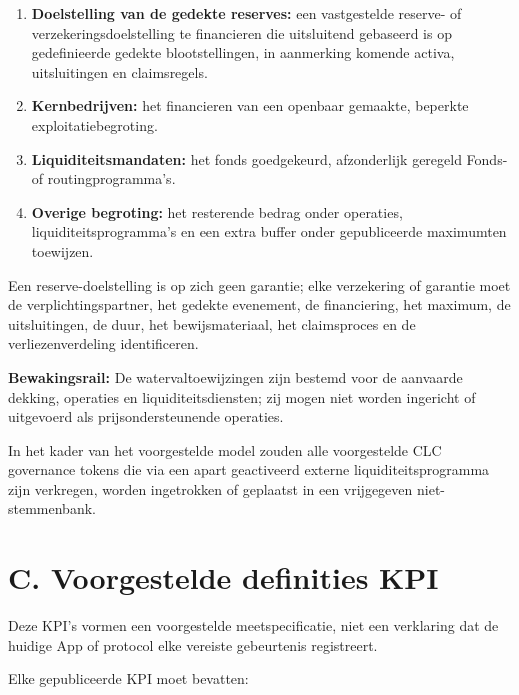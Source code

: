 \documentclass[11pt]{article}
\begin{document}
\begin{enumerate}[leftmargin=*]
\item \textbf{Doelstelling van de gedekte reserves:} een vastgestelde reserve- of verzekeringsdoelstelling te financieren die uitsluitend gebaseerd is op gedefinieerde gedekte blootstellingen, in aanmerking komende activa, uitsluitingen en claimsregels.
\item \textbf{Kernbedrijven:} het financieren van een openbaar gemaakte, beperkte exploitatiebegroting.
\item \textbf{Liquiditeitsmandaten:} het fonds goedgekeurd, afzonderlijk geregeld Fonds- of routingprogramma's.
\item \textbf{Overige begroting:} het resterende bedrag onder operaties, liquiditeitsprogramma's en een extra buffer onder gepubliceerde maximumten toewijzen.
\end{enumerate}
Een reserve-doelstelling is op zich geen garantie; elke verzekering of garantie moet de verplichtingspartner, het gedekte evenement, de financiering, het maximum, de uitsluitingen, de duur, het bewijsmateriaal, het claimsproces en de verliezenverdeling identificeren.

\textbf{Bewakingsrail:} De watervaltoewijzingen zijn bestemd voor de aanvaarde dekking, operaties en liquiditeitsdiensten; zij mogen niet worden ingericht of uitgevoerd als prijsondersteunende operaties.

In het kader van het voorgestelde model zouden alle voorgestelde CLC governance tokens die via een apart geactiveerd externe liquiditeitsprogramma zijn verkregen, worden ingetrokken of geplaatst in een vrijgegeven niet-stemmenbank.


\section*{C. Voorgestelde definities KPI}

Deze KPI's vormen een voorgestelde meetspecificatie, niet een verklaring dat de huidige App of protocol elke vereiste gebeurtenis registreert.

Elke gepubliceerde KPI moet bevatten:
\end{document}
